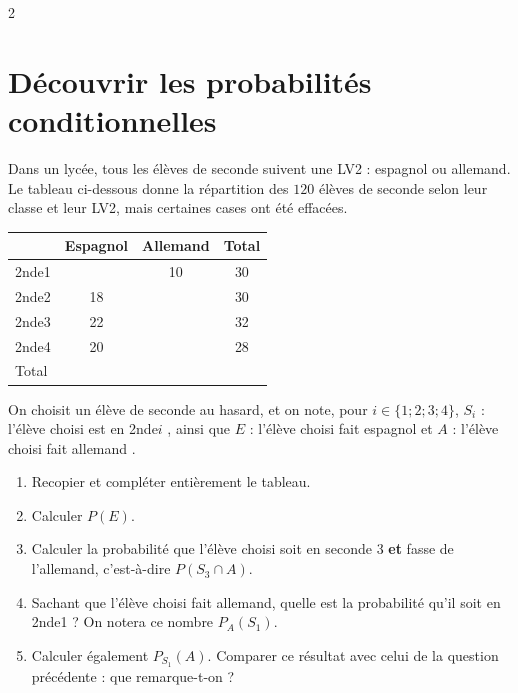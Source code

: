 \documentclass[10pt,a4paper]{article}
\begin{document}
\begin{multicols}{2}
\section{Découvrir les probabilités conditionnelles}


\begin{exo}
Dans un lycée, tous les élèves de seconde suivent une LV2 : espagnol ou allemand. Le tableau ci-dessous donne la répartition des \(120\) élèves de seconde selon leur classe et leur LV2, mais certaines cases ont été effacées.

\smallskip

\begin{center}
\begin{tabular}{|l|c|c|c|}
    \hline
     & Espagnol & Allemand & Total \\
    \hline
    2nde1 &  & 10 & 30 \\
    \hline
    2nde2 & 18 &  & 30 \\
    \hline
    2nde3 & 22 &  & 32 \\
    \hline
    2nde4 & 20 &  & 28 \\
    \hline
    Total &  &  &  \\
    \hline
\end{tabular}
\end{center}

On choisit un élève de seconde au hasard, et on note, pour \(i\in\{1;2;3;4\}\), \(S_i\) : \og l'élève choisi est en 2nde\(i\) \fg{}, ainsi que \(E\) : \og l'élève choisi fait espagnol \fg{} et \(A\) : \og l'élève choisi fait allemand \fg{}.

\begin{enumerate}[leftmargin=*]
    \item Recopier et compléter entièrement le tableau.
    \item Calculer \(P(E)\).
    \item Calculer la probabilité que l'élève choisi soit en seconde 3 \textbf{et} fasse de l'allemand, c'est-à-dire  \mbox{\(P(S_3\cap A)\)}.
    \item Sachant que l'élève choisi fait allemand, quelle est la probabilité qu'il soit en 2nde1 ? On notera ce nombre \(P_A(S_1)\).
    \item Calculer également \(P_{S_1}(A)\). Comparer ce résultat avec celui de la question précédente : que remarque-t-on ?
\end{enumerate}
\end{exo}


\end{multicols}
\end{document}
